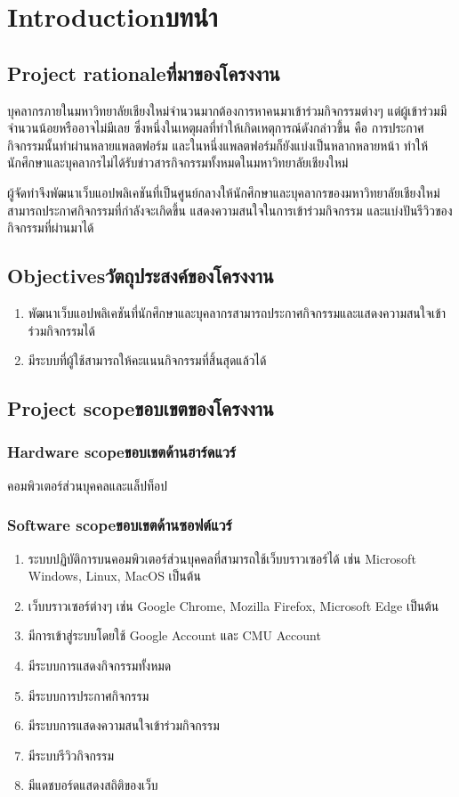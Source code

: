\chapter{\ifenglish Introduction\else บทนำ\fi}

\section{\ifenglish Project rationale\else ที่มาของโครงงาน\fi}
\hspace{\parindent}บุคลากรภายในมหาวิทยาลัยเชียงใหม่จำนวนมากต้องการหาคนมาเข้าร่วมกิจกรรมต่างๆ แต่ผู้เข้าร่วมมีจำนวนน้อยหรืออาจไม่มีเลย
ซึ่งหนึ่งในเหตุผลที่ทำให้เกิดเหตุการณ์ดังกล่าวขึ้น คือ การประกาศกิจกรรมนั้นทำผ่านหลายแพลตฟอร์ม และในหนึ่งแพลตฟอร์มก็ยังแบ่งเป็นหลากหลายหน้า
ทำให้นักศึกษาและบุคลากรไม่ได้รับข่าวสารกิจกรรมทั้งหมดในมหาวิทยาลัยเชียงใหม่ 

ผู้จัดทำจึงพัฒนาเว็บแอปพลิเคชันที่เป็นศูนย์กลางให้นักศึกษาและบุคลากรของมหาวิทยาลัยเชียงใหม่สามารถประกาศกิจกรรมที่กำลังจะเกิดขึ้น 
แสดงความสนใจในการเข้าร่วมกิจกรรม และแบ่งปันรีวิวของกิจกรรมที่ผ่านมาได้
\section{\ifenglish Objectives\else วัตถุประสงค์ของโครงงาน\fi}
\begin{enumerate}
    \item พัฒนาเว็บแอปพลิเคชันที่นักศึกษาและบุคลากรสามารถประกาศกิจกรรมและแสดงความสนใจเข้าร่วมกิจกรรมได้
    \item มีระบบที่ผู้ใช้สามารถให้คะแนนกิจกรรมที่สิ้นสุดแล้วได้
\end{enumerate}

\section{\ifenglish Project scope\else ขอบเขตของโครงงาน\fi}

\subsection{\ifenglish Hardware scope\else ขอบเขตด้านฮาร์ดแวร์\fi}
คอมพิวเตอร์ส่วนบุคคลและแล็ปท็อป
\subsection{\ifenglish Software scope\else ขอบเขตด้านซอฟต์แวร์\fi}
\begin{enumerate}
    \item ระบบปฏิบัติการบนคอมพิวเตอร์ส่วนบุคคลที่สามารถใช้เว็บบราวเซอร์ได้ เช่น Microsoft Windows, Linux, MacOS เป็นต้น
    \item เว็บบราวเซอร์ต่างๆ เช่น Google Chrome, Mozilla Firefox, Microsoft Edge เป็นต้น
    \item มีการเข้าสู่ระบบโดยใช้ Google Account และ CMU Account
    \item มีระบบการแสดงกิจกรรมทั้งหมด
    \item มีระบบการประกาศกิจกรรม
    \item มีระบบการแสดงความสนใจเข้าร่วมกิจกรรม
    \item มีระบบรีวิวกิจกรรม
    \item มีแดชบอร์ดแสดงสถิติของเว็บ
\end{enumerate}
